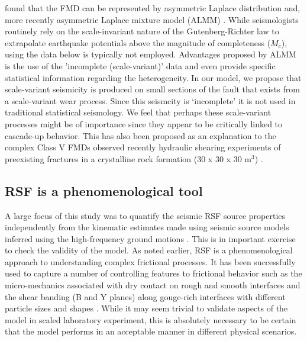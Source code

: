 \documentclass[preprint,1p, 10pt,authoryear]{elsarticle}
\begin{document}
\citet{Mignan2012} found that the FMD can be represented by asymmetric Laplace distribution and, more recently asymmetric Laplace mixture model (ALMM) \citet{Mignan2020}. While seismologists routinely rely on the scale-invariant nature of the Gutenberg-Richter law to extrapolate earthquake potentials above the magnitude of completeness ($M_{c}$), using the data below is typically not employed. Advantages proposed by ALMM is the use of the 'incomplete (scale-variant)' data and even provide specific statistical information regarding the heterogeneity. In our model, we propose that scale-variant seismicity is produced on small sections of the fault that exists from a scale-variant wear process.  Since this seismcity is `incomplete' it is not used in traditional statistical seismology.  We feel that perhaps these scale-variant processes might be of importance since they appear to be critically linked to cascade-up behavior. This has also been proposed as an explanation to the complex Class V FMDs \citep{Mignan2012} observed recently hydraulic shearing experiments of preexisting fractures in a crystalline rock formation (30 x 30 x 30 m$^{3}$) \citep{Villiger2019}.

\subsection{RSF is a phenomenological tool}

A large focus of this study was to quantify the seismic RSF source properties independently from the kinematic estimates made using seismic source models inferred using the high-frequency ground motions \citep{Selvadurai2019}. This is in important exercise to check the validity of the model. As noted earlier, RSF is a phenomenological approach to understanding complex frictional processes.  It has been successfully used to capture a number of controlling features to frictional behavior such as the micro-mechanics associated with dry contact on rough and smooth interfaces \citep{Marone1973, Marone1998,Dieterich1981,Yoshioka1997} and the shear banding (B and Y planes) along gouge-rich interfaces with different particle sizes and shapes \citep{Marone1993, Anthony2005,Scuderi2017}. While it may seem trivial to validate aspects of the model in scaled laboratory experiment, this is absolutely necessary to be certain that the model performs in an acceptable manner in different physical scenarios. 
\end{document}
